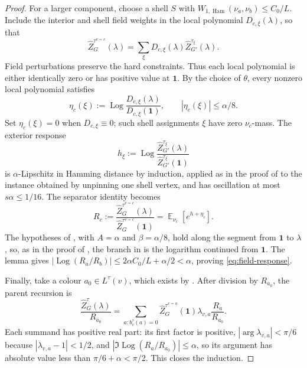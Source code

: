 \documentclass[11pt,reqno]{article}
\theoremstyle{plain}
\theoremstyle{definition}
\theoremstyle{remark}
\theoremstyle{definition}
\theoremstyle{remark}
\newcommand{\Log}{\operatorname{Log}}          %
\DeclareMathOperator{\E}{\mathbb{E}}
\DeclareMathOperator{\Ham}{Ham}
\newcommand{\WHam}{W_{1,\Ham}}                   %
\newcommand{\bcount}{b}
\newcommand{\nZpin}[2]{\widehat Z_{#1}^{#2}}
\newcommand{\hardlist}[2]{L^{#1}(#2)}
\begin{document}
\begin{proof}
For a larger component, choose a shell \(S\) with
\(\WHam(\nu_a,\nu_b)\le C_0/L\).  Include the interior and shell field
weights in the local polynomial \(D_{c,\xi}(\lambda)\), so that
\[
  \nZpin{G}{\tau^{v=c}}(\lambda)
  =\sum_\xi D_{c,\xi}(\lambda)\nZpin{G'}{\tau_\xi}(\lambda).
\]
Field perturbations preserve the hard constraints.  Thus each local
polynomial is either identically zero or has positive value at
\(\mathbf1\).  By the choice of \(\theta\), every nonzero local
polynomial satisfies
\[
  \eta_c(\xi):=\Log\frac{D_{c,\xi}(\lambda)}{D_{c,\xi}(\mathbf1)},
  \qquad |\eta_c(\xi)|\le\alpha/8.
\]
Set \(\eta_c(\xi)=0\) when \(D_{c,\xi}\equiv0\); such shell assignments
\(\xi\) have zero \(\nu_c\)-mass.  The exterior response
\[
  h_\xi:=\Log\frac{\nZpin{G'}{\tau_\xi}(\lambda)}
                    {\nZpin{G'}{\tau_\xi}(\mathbf1)}
\]
is \(\alpha\)-Lipschitz in Hamming distance by induction, applied as in
the proof of  to the instance obtained
by unpinning one shell vertex, and has oscillation at most
\(s\alpha\le1/16\).  The separator identity becomes
\[
  R_c:=\frac{\nZpin{G}{\tau^{v=c}}(\lambda)}
             {\nZpin{G}{\tau^{v=c}}(\mathbf1)}
      =\E_{\nu_c}[e^{h+\eta_c}].
\]
The hypotheses of , with \(A=\alpha\) and
\(\beta=\alpha/8\), hold along the segment from \(\mathbf1\) to
\(\lambda\), so, as in the proof of ,
the branch in  is the logarithm continued from
\(\mathbf1\).  The lemma gives
\(|\Log(R_a/R_b)|\le2\alpha C_0/L+\alpha/2<\alpha\), proving
\eqref{eq:field-response}.

Finally, take a colour \(a_0\in\hardlist{\tau}{v}\), which exists by
.  After division by \(R_{a_0}\), the parent
recursion is
\[
  \frac{\nZpin{G}{\tau}(\lambda)}{R_{a_0}}
  =\sum_{a:\bcount_v^\tau(a)=0}
      \nZpin{G}{\tau^{v=a}}(\mathbf1)
      \lambda_{v,a}\frac{R_a}{R_{a_0}}.
\]
Each summand has positive real part: its first factor is positive,
\(|\arg\lambda_{v,a}|<\pi/6\) because \(|\lambda_{v,a}-1|<1/2\), and
\(|\Im\Log(R_a/R_{a_0})|\le\alpha\), so its argument has absolute value
less than \(\pi/6+\alpha<\pi/2\).  This closes the induction.
\end{proof}
\end{document}
